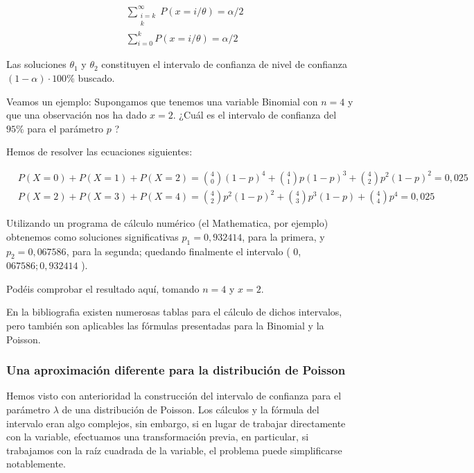 \documentclass[
]{article}
\begin{document}
\[
\begin{aligned}
& \sum_{\substack{i=k \\
k}}^{\infty} P(x=i / \theta)=\alpha / 2 \\
& \sum_{i=0}^{k} P(x=i / \theta)=\alpha / 2
\end{aligned}
\]

Las soluciones \(\theta_{1}\) y \(\theta_{2}\) constituyen el intervalo de confianza de nivel de confianza \((1-\alpha) \cdot 100 \%\) buscado.

Veamos un ejemplo:
Supongamos que tenemos una variable Binomial con \(n=4\) y que una observación nos ha dado \(x=2\). ¿Cuál es el intervalo de confianza del \(95 \%\) para el parámetro \(p\) ?

Hemos de resolver las ecuaciones siguientes:

\[
\begin{aligned}
& P(X=0)+P(X=1)+P(X=2)=\binom{4}{0}(1-p)^{4}+\binom{4}{1} p(1-p)^{3}+\binom{4}{2} p^{2}(1-p)^{2}=0,025 \\
& P(X=2)+P(X=3)+P(X=4)=\binom{4}{2} p^{2}(1-p)^{2}+\binom{4}{3} p^{3}(1-p)+\binom{4}{4} p^{4}=0,025
\end{aligned}
\]

Utilizando un programa de cálculo numérico (el Mathematica, por ejemplo) obtenemos como soluciones significativas \(p_{1}=0,932414\), para la primera, y \(p_{2}=0,067586\), para la segunda; quedando finalmente el intervalo ( 0,\(067586 ; 0,932414\) ).

Podéis comprobar el resultado aquí, tomando \(n=4\) y \(x=2\).

En la bibliografia existen numerosas tablas para el cálculo de dichos intervalos, pero también son aplicables las fórmulas presentadas para la Binomial y la Poisson.

\subsubsection{Una aproximación diferente para la distribución de Poisson}\label{una-aproximaciuxf3n-diferente-para-la-distribuciuxf3n-de-poisson}

Hemos visto con anterioridad la construcción del intervalo de confianza para el parámetro \(\lambda\) de una distribución de Poisson. Los cálculos y la fórmula del intervalo eran algo complejos, sin embargo, si en lugar de trabajar directamente con la variable, efectuamos una transformación previa, en particular, si trabajamos con la raíz cuadrada de la variable, el problema puede simplificarse notablemente.
\end{document}
